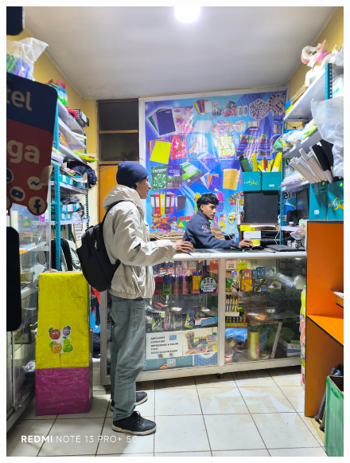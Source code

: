 \documentclass[12pt]{article}
\begin{document}
\newpage %
\begin{figure}[htbp]
\centering
\begin{minipage}[b]{0.48\textwidth}
  \centering
  \includegraphics[width=\textwidth]{5.jpeg}
 

\end{minipage}
\end{figure}
\end{document}
